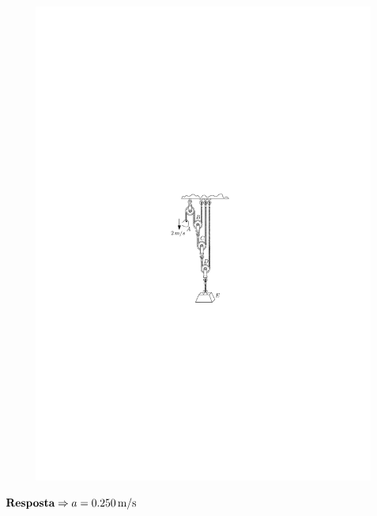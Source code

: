 \documentclass[a4paper,12pt]{article}
\begin{document}
\begin{enumerate}
		\begin{figure}[h!]
			\centering
			\includegraphics[scale=1.7]{images/draw_9}
		\end{figure}
		
		$\textbf{\text{Resposta}}\Rightarrow	a=\SI{0.250}{\meter/\second}$
		
	\end{enumerate}
\end{document}
